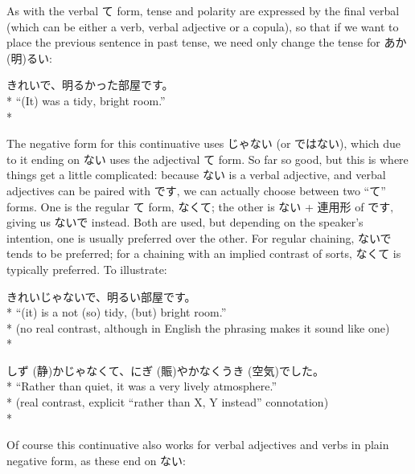\documentclass[11pt, b5paper, twoside, openright, onecolumn]{book}
\makeatletter
\newcommand*{\rubystack}[2]{{\relscale{0.5}%
  \begin{tabular}[b]{@{}c@{}}%
    {#1}\\%
   {\textscale{2}{#2}}%
  \end{tabular}}%
}
\DeclareRobustCommand*{\ruby}[2]{%
  \mbox{%
    \setlength{\parskip}{0ex}%
    \BeginAccSupp{method=pdfstringdef,ActualText={#1}}%
      \rubystack{\phantom{#2}}{#1}%
      \llap{%
        \rubystack{#2}{\phantom{#1}}%
      }%
    \EndAccSupp{}%
  }%
}
\renewcommand*{\ruby}[2]{#2 (#1)}%
\newenvironment{exampleblock}{
\setlength{\parindent}{0.6in}
\begin{minipage}[t]{\dimexpr\textwidth-\parindent}}
{\end{minipage}}
\makeatother
\begin{document}
As with the verbal て form‚ tense and polarity are expressed by the final verbal (which can be either a verb‚ verbal adjective or a copula)‚ so that if we want to place the previous sentence in past tense‚ we need only change the tense for \ruby{明}{あか}るい:

\vspace{0.4cm}
\begin{exampleblock}
きれいで、明るかった部屋です。 \\* 
“(It) was a tidy‚ bright room.” \\* 
\end{exampleblock}
\vspace{0.2cm}

The negative form for this continuative uses じゃない (or ではない)‚ which due to it ending on ない uses the adjectival て form. So far so good‚ but this is where things get a little complicated: because ない is a verbal adjective‚ and verbal adjectives can be paired with です‚ we can actually choose between two “て” forms. One is the regular て form‚ なくて; the other is ない + 連用形 of です‚ giving us ないで instead. Both are used‚ but depending on the speaker’s intention‚ one is usually preferred over the other. For regular chaining‚ ないで tends to be preferred; for a chaining with an implied contrast of sorts‚ なくて is typically preferred. To illustrate:

\vspace{0.4cm}
\begin{exampleblock}
きれいじゃないで、明るい部屋です。 \\* 
“(it) is a not (so) tidy‚ (but) bright room.” \\* 
(no real contrast‚ although in English the phrasing makes it sound like one) \\* 
\end{exampleblock}
\vspace{0.2cm}

\begin{exampleblock}
\ruby{静}{しず}かじゃなくて、\ruby{賑}{にぎ}やかな\ruby{空気}{くうき}でした。 \\* 
“Rather than quiet‚ it was a very lively atmosphere.” \\* 
(real contrast‚ explicit “rather than X‚ Y instead” connotation) \\* 
\end{exampleblock}
\vspace{0.2cm}

Of course this continuative also works for verbal adjectives and verbs in plain negative form‚ as these end on ない:
\end{document}
